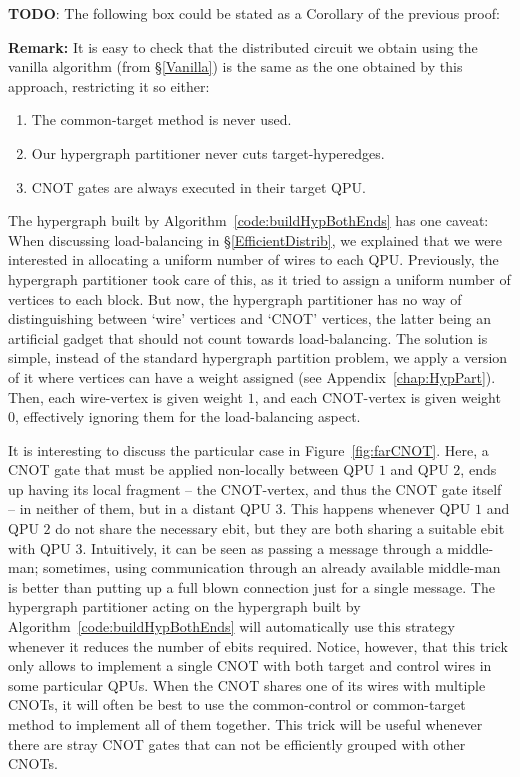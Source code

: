 \textbf{TODO}: The following box could be stated as a Corollary of the previous proof:

\begin{mdframed}[backgroundcolor=gray!20,leftmargin=20pt,rightmargin=20pt, innerbottommargin=10pt] 
\small
\textbf{Remark:} It is easy to check that the distributed circuit we obtain using the vanilla algorithm (from \S\ref{Vanilla}) is the same as the one obtained by this approach, restricting it so either:
\begin{enumerate}
  \renewcommand{\theenumi}{\alph{enumi})}
  \item The common-target method is never used.
  \item Our hypergraph partitioner never cuts target-hyperedges.
  \item CNOT gates are always executed in their target QPU.
\end{enumerate}
\end{mdframed}

The hypergraph built by Algorithm~\ref{code:buildHypBothEnds} has one caveat: When discussing load-balancing in \S\ref{EfficientDistrib}, we explained that we were interested in allocating a uniform number of wires to each QPU. Previously, the hypergraph partitioner took care of this, as it tried to assign a uniform number of vertices to each block. But now, the hypergraph partitioner has no way of distinguishing between `wire' vertices and `CNOT' vertices, the latter being an artificial gadget that should not count towards load-balancing. The solution is simple, instead of the standard hypergraph partition problem, we apply a version of it where vertices can have a weight assigned (see Appendix~\ref{chap:HypPart}). Then, each wire-vertex is given weight \(1\), and each CNOT-vertex is given weight \(0\), effectively ignoring them for the load-balancing aspect.

It is interesting to discuss the particular case in Figure~\ref{fig:farCNOT}. Here, a CNOT gate that must be applied non-locally between QPU \(1\) and QPU \(2\), ends up having its local fragment -- the CNOT-vertex, and thus the CNOT gate itself --  in neither of them, but in a distant QPU \(3\). This happens whenever QPU \(1\) and QPU \(2\) do not share the necessary ebit, but they are both sharing a suitable ebit with QPU \(3\). Intuitively, it can be seen as passing a message through a middle-man; sometimes, using communication through an already available middle-man is better than putting up a full blown connection just for a single message. The hypergraph partitioner acting on the hypergraph built by Algorithm~\ref{code:buildHypBothEnds} will automatically use this strategy whenever it reduces the number of ebits required. Notice, however, that this trick only allows to implement a single CNOT with both target and control wires in some particular QPUs. When the CNOT shares one of its wires with multiple CNOTs, it will often be best to use the common-control or common-target method to implement all of them together. This trick will be useful whenever there are stray CNOT gates that can not be efficiently grouped with other CNOTs.

